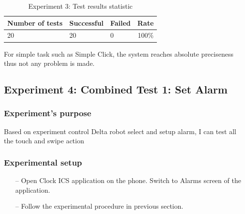 \begin{table}[H]
	\centering
	\caption{Experiment 3: Test results statistic}	
	\label{tab:exp3_result_stat}
	\begin{tabular}{|lll|r|}
		\hline
		\textbf{Number of tests} & \textbf{Successful} & \textbf{Failed} & \textbf{Rate} \\
		\hline
		20 & 20 & 0 & 100$\%$\\
		\hline
	\end{tabular}
\end{table}
For simple task such as Simple Click, the system reaches absolute preciseness thus not any problem is made.

\subsection{Experiment 4: Combined Test 1: Set Alarm}
\subsubsection{Experiment's purpose}
Based on experiment control Delta robot select and setup alarm, I can test all the touch and swipe action
\subsubsection{Experimental setup}
	\begin{itemize}
		\item[--]Open Clock ICS application on the phone. Switch to Alarms screen of the application.
		\item[--]Follow the experimental procedure in previous section.
	\end{itemize}

